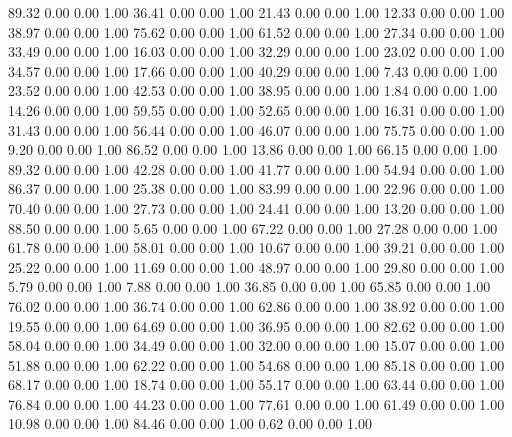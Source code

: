    89.32   0.00   0.00   1.00
   36.41   0.00   0.00   1.00
   21.43   0.00   0.00   1.00
   12.33   0.00   0.00   1.00
   38.97   0.00   0.00   1.00
   75.62   0.00   0.00   1.00
   61.52   0.00   0.00   1.00
   27.34   0.00   0.00   1.00
   33.49   0.00   0.00   1.00
   16.03   0.00   0.00   1.00
   32.29   0.00   0.00   1.00
   23.02   0.00   0.00   1.00
   34.57   0.00   0.00   1.00
   17.66   0.00   0.00   1.00
   40.29   0.00   0.00   1.00
    7.43   0.00   0.00   1.00
   23.52   0.00   0.00   1.00
   42.53   0.00   0.00   1.00
   38.95   0.00   0.00   1.00
    1.84   0.00   0.00   1.00
   14.26   0.00   0.00   1.00
   59.55   0.00   0.00   1.00
   52.65   0.00   0.00   1.00
   16.31   0.00   0.00   1.00
   31.43   0.00   0.00   1.00
   56.44   0.00   0.00   1.00
   46.07   0.00   0.00   1.00
   75.75   0.00   0.00   1.00
    9.20   0.00   0.00   1.00
   86.52   0.00   0.00   1.00
   13.86   0.00   0.00   1.00
   66.15   0.00   0.00   1.00
   89.32   0.00   0.00   1.00
   42.28   0.00   0.00   1.00
   41.77   0.00   0.00   1.00
   54.94   0.00   0.00   1.00
   86.37   0.00   0.00   1.00
   25.38   0.00   0.00   1.00
   83.99   0.00   0.00   1.00
   22.96   0.00   0.00   1.00
   70.40   0.00   0.00   1.00
   27.73   0.00   0.00   1.00
   24.41   0.00   0.00   1.00
   13.20   0.00   0.00   1.00
   88.50   0.00   0.00   1.00
    5.65   0.00   0.00   1.00
   67.22   0.00   0.00   1.00
   27.28   0.00   0.00   1.00
   61.78   0.00   0.00   1.00
   58.01   0.00   0.00   1.00
   10.67   0.00   0.00   1.00
   39.21   0.00   0.00   1.00
   25.22   0.00   0.00   1.00
   11.69   0.00   0.00   1.00
   48.97   0.00   0.00   1.00
   29.80   0.00   0.00   1.00
    5.79   0.00   0.00   1.00
    7.88   0.00   0.00   1.00
   36.85   0.00   0.00   1.00
   65.85   0.00   0.00   1.00
   76.02   0.00   0.00   1.00
   36.74   0.00   0.00   1.00
   62.86   0.00   0.00   1.00
   38.92   0.00   0.00   1.00
   19.55   0.00   0.00   1.00
   64.69   0.00   0.00   1.00
   36.95   0.00   0.00   1.00
   82.62   0.00   0.00   1.00
   58.04   0.00   0.00   1.00
   34.49   0.00   0.00   1.00
   32.00   0.00   0.00   1.00
   15.07   0.00   0.00   1.00
   51.88   0.00   0.00   1.00
   62.22   0.00   0.00   1.00
   54.68   0.00   0.00   1.00
   85.18   0.00   0.00   1.00
   68.17   0.00   0.00   1.00
   18.74   0.00   0.00   1.00
   55.17   0.00   0.00   1.00
   63.44   0.00   0.00   1.00
   76.84   0.00   0.00   1.00
   44.23   0.00   0.00   1.00
   77.61   0.00   0.00   1.00
   61.49   0.00   0.00   1.00
   10.98   0.00   0.00   1.00
   84.46   0.00   0.00   1.00
    0.62   0.00   0.00   1.00
